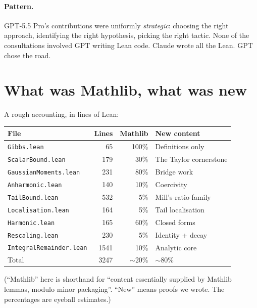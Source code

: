 \documentclass[11pt]{article}
\begin{document}
\paragraph{Pattern.} GPT-5.5 Pro's contributions were uniformly
\emph{strategic}: choosing the right approach, identifying the right
hypothesis, picking the right tactic. None of the consultations involved
GPT writing Lean code. Claude wrote all the Lean. GPT chose the road.

\section{What was Mathlib, what was new}

A rough accounting, in lines of Lean:

\begin{center}
\begin{tabular}{lrrl}
\hline
File & Lines & Mathlib & New content \\
\hline
\texttt{Gibbs.lean} & 65 & 100\% & Definitions only \\
\texttt{ScalarBound.lean} & 179 & 30\% & The Taylor cornerstone \\
\texttt{GaussianMoments.lean} & 231 & 80\% & Bridge work \\
\texttt{Anharmonic.lean} & 140 & 10\% & Coercivity \\
\texttt{TailBound.lean} & 532 & 5\% & Mill's-ratio family \\
\texttt{Localisation.lean} & 164 & 5\% & Tail localisation \\
\texttt{Harmonic.lean} & 165 & 60\% & Closed forms \\
\texttt{Rescaling.lean} & 230 & 5\% & Identity + decay \\
\texttt{IntegralRemainder.lean} & 1541 & 10\% & Analytic core \\
\hline
Total & 3247 & $\sim$20\% & $\sim$80\% \\
\hline
\end{tabular}
\end{center}

(``Mathlib'' here is shorthand for ``content essentially supplied by
Mathlib lemmas, modulo minor packaging''. ``New'' means proofs we wrote.
The percentages are eyeball estimates.)
\end{document}
